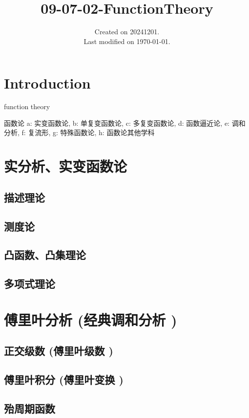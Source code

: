 \documentclass[UTF8]{../../09-Mathematics}
\begin{document}
\title{09-07-02-FunctionTheory}
\date{Created on 20241201.\\   Last modified on \today.}
\maketitle
\tableofcontents


\chapter{Introduction}


function theory


函数论
a: 实变函数论, 
b: 单复变函数论, 
c: 多复变函数论, 
d: 函数逼近论, 
e: 调和分析, 
f: 复流形, 
g: 特殊函数论, 
h: 函数论其他学科




\chapter{实分析、实变函数论}
    \section{描述理论}
    \section{测度论}
    \section{凸函数、凸集理论}
    \section{多项式理论}


\chapter{傅里叶分析 (经典调和分析 )}
    \section{正交级数 (傅里叶级数 )}
    \section{傅里叶积分 (傅里叶变换 )}
    \section{殆周期函数}
\end{document}
